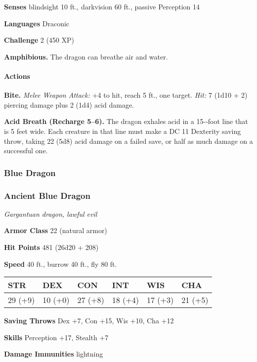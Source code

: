 \documentclass[
]{article}
\begin{document}
\textbf{Senses} blindsight 10 ft., darkvision 60 ft., passive Perception
14

\textbf{Languages} Draconic

\textbf{Challenge} 2 (450 XP)

\textbf{Amphibious.} The dragon can breathe air and water.

\hypertarget{actions-26}{%
\paragraph{Actions}\label{actions-26}}

\textbf{Bite.} \emph{Melee Weapon Attack:} +4 to hit, reach 5 ft., one
target. \emph{Hit:} 7 (1d10 + 2) piercing damage plus 2 (1d4) acid
damage.

\textbf{Acid Breath (Recharge 5--6).} The dragon exhales acid in a
15-­‐foot line that is 5 feet wide. Each creature in that line must make
a DC 11 Dexterity saving throw, taking 22 (5d8) acid damage on a failed
save, or half as much damage on a successful one.

\hypertarget{blue-dragon}{%
\subsubsection{Blue Dragon}\label{blue-dragon}}

\hypertarget{ancient-blue-dragon}{%
\subsubsection{Ancient Blue Dragon}\label{ancient-blue-dragon}}

\emph{Gargantuan dragon, lawful evil}

\textbf{Armor Class} 22 (natural armor)

\textbf{Hit Points} 481 (26d20 + 208)

\textbf{Speed} 40 ft., burrow 40 ft., fly 80 ft.

\begin{longtable}[]{@{}llllll@{}}
\toprule
STR & DEX & CON & INT & WIS & CHA\tabularnewline
\midrule
\endhead
29 (+9) & 10 (+0) & 27 (+8) & 18 (+4) & 17 (+3) & 21 (+5)\tabularnewline
\bottomrule
\end{longtable}

\textbf{Saving Throws} Dex +7, Con +15, Wis +10, Cha +12

\textbf{Skills} Perception +17, Stealth +7

\textbf{Damage Immunities} lightning
\end{document}
